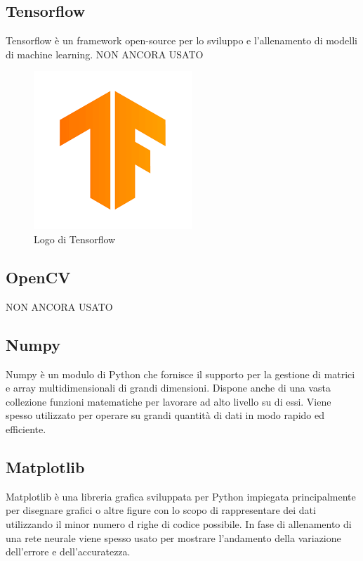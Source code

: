 \subsection{Tensorflow}
Tensorflow è un framework open-source per lo sviluppo e l'allenamento di modelli di machine learning. NON ANCORA USATO
\begin{figure}[H]
	\centering
	\includegraphics[width=0.3\linewidth]{images/logo-tensorflow.png}
	\caption{Logo di Tensorflow}
	\label{Logo di Tensorflow}
\end{figure}
\subsection{OpenCV}
NON ANCORA USATO
\subsection{Numpy}
Numpy è un modulo di Python che fornisce il supporto per
la gestione di matrici e array multidimensionali di grandi dimensioni. Dispone anche di una vasta collezione funzioni matematiche per lavorare ad alto livello su di essi. Viene spesso utilizzato per operare su grandi quantità di dati in modo rapido ed efficiente.
\subsection{Matplotlib}
Matplotlib è una libreria grafica sviluppata per Python impiegata principalmente per disegnare grafici o altre figure con lo scopo di rappresentare dei dati utilizzando il minor numero d righe di codice possibile. In fase di allenamento di una rete neurale viene spesso usato per mostrare l'andamento della variazione dell'errore e dell'accuratezza.
